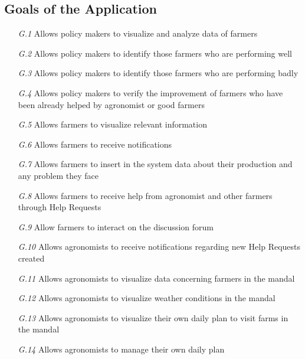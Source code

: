 \subsection{Goals of the Application}
\begin{itemize}
    \item [\textit {G.1}] Allows policy makers to visualize and analyze data of farmers
    \item [\textit {G.2}] Allows policy makers to identify those farmers who are performing well
    \item [\textit {G.3}] Allows policy makers to identify those farmers who are performing badly
    \item [\textit {G.4}] Allows policy makers to verify the improvement of farmers who have been already helped by agronomist or good farmers
    \item [\textit {G.5}] Allows farmers to visualize relevant information
    \item [\textit {G.6}] Allows farmers to receive notifications
    \item [\textit {G.7}] Allows farmers to insert in the system data about their production and any problem they face
    \item [\textit {G.8}] Allows farmers to receive help from agronomist and other farmers through Help Requests
    \item [\textit {G.9}] Allow farmers to interact on the discussion forum
    \item [\textit {G.10}] Allows agronomists to receive notifications regarding new Help Requests created
    \item [\textit {G.11}] Allows agronomists to visualize data concerning farmers in the mandal
    \item [\textit {G.12}] Allows agronomists to visualize weather conditions in the mandal
    \item [\textit {G.13}] Allows agronomists to visualize their own daily plan to visit farms in the mandal
    \item [\textit {G.14}] Allows agronomists to manage their own daily plan

\end{itemize}